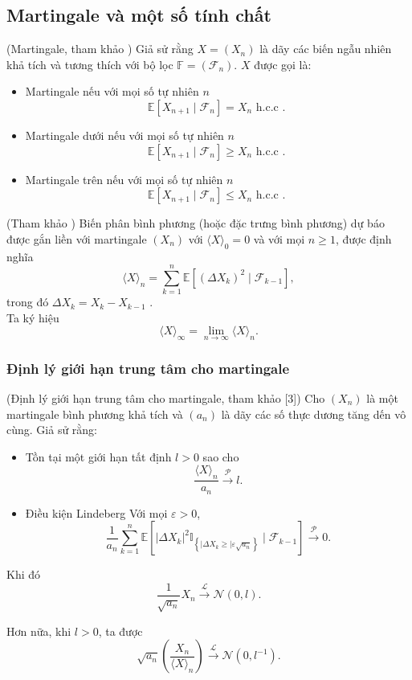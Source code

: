 \subsection{Martingale và một số tính chất}
{\dn (Martingale, tham khảo \cite{duflo}) Giả sử rằng $X=\left(X_n\right)$ là dãy các biến ngẫu nhiên khả tích và tương thích với bộ lọc $\mathbb{F} = \left(\mathcal{F}_n\right)$. $X$ được gọi là:
\begin{itemize}
    \item Martingale nếu với mọi số tự nhiên $n$
$$
\mathbb{E}\left[X_{n+1} \mid \mathcal{F}_n\right]=X_n \text { h.c.c . }
$$
    \item Martingale dưới nếu với mọi số tự nhiên $n$
$$
\mathbb{E}\left[X_{n+1} \mid \mathcal{F}_n\right] \geq X_n \text { h.c.c . }
$$
    \item Martingale trên nếu với mọi số tự nhiên $n$
$$
\mathbb{E}\left[X_{n+1} \mid \mathcal{F}_n\right] \leq X_n \text { h.c.c . }
$$
\end{itemize}
}
{\dn (Tham khảo \cite{duflo}) Biến phân bình phương (hoặc đặc trưng bình phương) dự báo được gắn liền với martingale $\left(X_{n}\right)$ với $\langle X\rangle_{0}=0$ và với mọi $n \geq 1$, được định nghĩa 
$$
\langle X\rangle_{n}=\sum_{k=1}^{n} \mathbb{E}\left[\left(\Delta X_{k}\right)^{2} \mid \mathcal{F}_{k-1}\right],
$$
trong đó $\Delta X_{k}=X_{k}-X_{k-1}$ .\\
Ta ký hiệu
$$
\langle X\rangle_{\infty}=\lim _{n \rightarrow \infty}\langle X\rangle_{n} . 
$$}
\subsubsection{Định lý giới hạn trung tâm cho martingale}
{\dl (Định lý giới hạn trung tâm cho martingale, tham khảo [3]) Cho $\left(X_n\right)$ là một martingale bình phương khả tích và $\left(a_n\right)$ là dãy các số thực dương tăng dến vô cùng. Giả sử rằng:
\begin{itemize}
    \item Tồn tại một giới hạn tất định $l>0$ sao cho
    $$
    \frac{\langle X\rangle_n}{a_n} \xrightarrow{\mathcal{P}} l .
    $$
    \item Điều kiện Lindeberg
    Với mọi $\varepsilon>0$,
    $$
    \frac{1}{a_n} \sum_{k=1}^n \mathbb{E}\left[\left|\Delta X_k\right|^2 \mathbb{I}_{\left\{\left|\Delta X_k \geq\right| \varepsilon \sqrt{a_n}\right\}} \mid \mathcal{F}_{k-1}\right] \xrightarrow{\mathcal{P}} 0 .
    $$
\end{itemize}

Khi đó
$$
\frac{1}{\sqrt{a_n}} X_n \xrightarrow{\mathcal{L}} \mathcal{N}(0, l) .
$$

Hơn nữa, khi $l>0$, ta được
$$
\sqrt{a_n}\left(\frac{X_n}{\langle X\rangle_n}\right) \stackrel{\mathcal{L}}{\rightarrow} \mathcal{N}\left(0, l^{-1}\right) .
$$}
